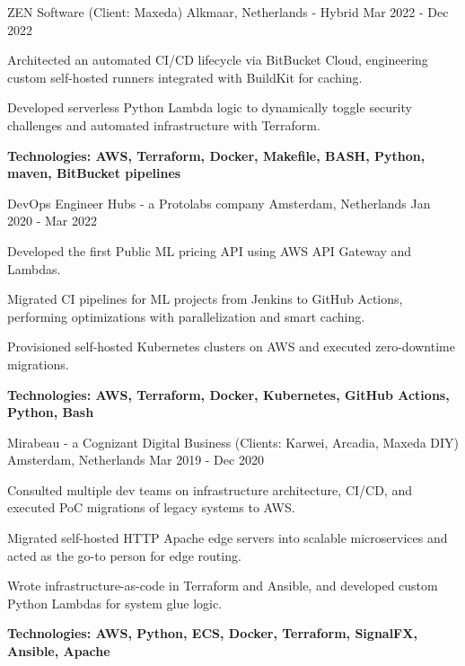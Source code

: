 \begin{cventries}
{ZEN Software (Client: Maxeda)}
{Alkmaar, Netherlands - Hybrid}
{Mar 2022 - Dec 2022}
{
	\begin{cvitems}
		\item {Architected an automated CI/CD lifecycle via BitBucket Cloud, engineering custom self-hosted runners integrated with BuildKit for caching.}
		\item {Developed serverless Python Lambda logic to dynamically toggle security challenges and automated infrastructure with Terraform.}
		\item {\bfseries{Technologies:} AWS, Terraform, Docker, Makefile, BASH, Python, maven, BitBucket pipelines}
	\end{cvitems}
}

\cventry
{DevOps Engineer}
{Hubs - a Protolabs company}
{Amsterdam, Netherlands}
{Jan 2020 - Mar 2022}
{
	\begin{cvitems}
		\item {Developed the first Public ML pricing API using AWS API Gateway and Lambdas.}
		\item {Migrated CI pipelines for ML projects from Jenkins to GitHub Actions, performing optimizations with parallelization and smart caching.}
		\item {Provisioned self-hosted Kubernetes clusters on AWS and executed zero-downtime migrations.}
		\item {\bfseries{Technologies:} AWS, Terraform, Docker, Kubernetes, GitHub Actions, Python, Bash}
	\end{cvitems}
}

{Mirabeau - a Cognizant Digital Business (Clients: Karwei, Arcadia, Maxeda DIY)}
{Amsterdam, Netherlands}
{Mar 2019 - Dec 2020}
{
	\begin{cvitems}
		\item {Consulted multiple dev teams on infrastructure architecture, CI/CD, and executed PoC migrations of legacy systems to AWS.}
		\item {Migrated self-hosted HTTP Apache edge servers into scalable microservices and acted as the go-to person for edge routing.}
		\item {Wrote infrastructure-as-code in Terraform and Ansible, and developed custom Python Lambdas for system glue logic.}
		\item {\bfseries{Technologies:} AWS, Python, ECS, Docker, Terraform, SignalFX, Ansible, Apache}
	\end{cvitems}
}


\end{cventries}
